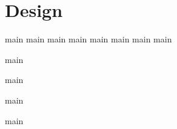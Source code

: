 \part{Design}\label{part:co-design}

{main}
{main}
{main}
{main}
{main}
{main}
{main}
{main}




{main}



{main}


{main}

{main}





